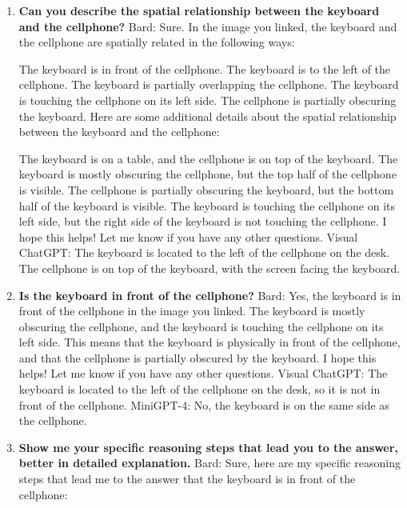     \begin{enumerate}
        \item \textbf{Can you describe the spatial relationship between the keyboard and the cellphone?}
        \subitem Bard: 
        Sure. In the image you linked, the keyboard and the cellphone are spatially related in the following ways:
        
        The keyboard is in front of the cellphone.
        The keyboard is to the left of the cellphone.
        The keyboard is partially overlapping the cellphone.
        The keyboard is touching the cellphone on its left side.
        The cellphone is partially obscuring the keyboard.
        Here are some additional details about the spatial relationship between the keyboard and the cellphone:
        
        The keyboard is on a table, and the cellphone is on top of the keyboard.
        The keyboard is mostly obscuring the cellphone, but the top half of the cellphone is visible.
        The cellphone is partially obscuring the keyboard, but the bottom half of the keyboard is visible.
        The keyboard is touching the cellphone on its left side, but the right side of the keyboard is not touching the cellphone.
        I hope this helps! Let me know if you have any other questions.
        \subitem Visual ChatGPT: The keyboard is located to the left of the cellphone on the desk.
        \subitem The cellphone is on top of the keyboard, with the screen facing the keyboard.
        \item \textbf{Is the keyboard in front of the cellphone?}
        \subitem Bard: Yes, the keyboard is in front of the cellphone in the image you linked. The keyboard is mostly obscuring the cellphone, and the keyboard is touching the cellphone on its left side. This means that the keyboard is physically in front of the cellphone, and that the cellphone is partially obscured by the keyboard. I hope this helps! Let me know if you have any other questions.
        \subitem Visual ChatGPT: The keyboard is located to the left of the cellphone on the desk, so it is not in front of the cellphone.
        \subitem MiniGPT-4: No, the keyboard is on the same side as the cellphone.
        \item \textbf{Show me your specific reasoning steps that lead you to the answer, better in detailed explanation.}
        \subitem Bard: Sure, here are my specific reasoning steps that lead me to the answer that the keyboard is in front of the cellphone:


\end{enumerate}
